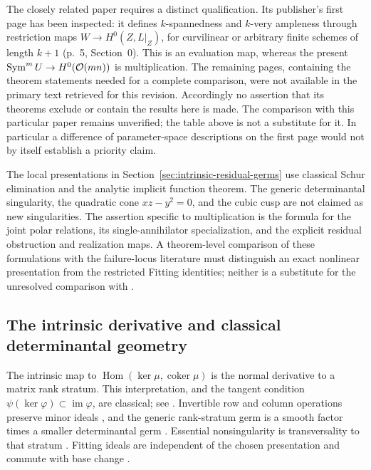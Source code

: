 The closely related paper \cite{Ballico93} requires a distinct
qualification. Its publisher's first page has been inspected: it
defines $k$-spannedness and $k$-very ampleness through restriction
maps $W\to H^0(Z,L|_Z)$, for curvilinear or arbitrary finite schemes
of length $k+1$ (p.~5, Section~0). This is an evaluation map, whereas
the present $\operatorname{Sym}^mU\to H^0(\mathcal O(mn))$ is multiplication. The remaining pages, containing the theorem
statements needed for a complete comparison, were not available in
the primary text retrieved for this revision. Accordingly no assertion
that its theorems exclude or contain the results here is made. The
comparison with this particular paper remains unverified; the table
above is not a substitute for it. In particular a difference of
parameter-space descriptions on the first page would not by itself
establish a priority claim.

The local presentations in Section~\ref{sec:intrinsic-residual-germs}
use classical Schur elimination and the analytic implicit function
theorem. The generic determinantal singularity, the quadratic cone
$xz-y^2=0$, and the cubic cusp are not claimed as new singularities.
The assertion specific to multiplication is the formula for the joint
polar relations, its single-annihilator specialization, and the
explicit residual obstruction and realization maps. A theorem-level
comparison of these formulations with the failure-locus literature
must distinguish an exact nonlinear presentation from the restricted
Fitting identities; neither is a substitute for the unresolved
comparison with \cite{Ballico93}.

\subsection{The intrinsic derivative and classical determinantal geometry}
The intrinsic map to $\operatorname{Hom}(\ker\mu,\operatorname{coker}\mu)$
is the normal derivative to a matrix rank stratum. This interpretation,
and the tangent condition $\psi(\ker\varphi)\subset\operatorname{im}\varphi$,
are classical; see \cite[Remark 1.18]{FKZ21}. Invertible row and column
operations preserve minor ideals \cite[Lemma 1.3]{FKZ21}, and the generic
rank-stratum germ is a smooth factor times a smaller determinantal germ
\cite[Section 1.3.2, equation (13)]{FKZ21}. Essential nonsingularity is
transversality to that stratum \cite[Definition 2.11 and Proposition 2.12]{FKZ21}.
Fitting ideals are independent of the chosen presentation and commute
with base change \cite[Tags 07Z8 and 07ZA]{StacksFitting}.

